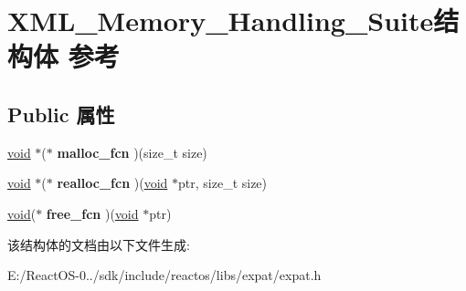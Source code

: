 \hypertarget{struct_x_m_l___memory___handling___suite}{}\section{X\+M\+L\+\_\+\+Memory\+\_\+\+Handling\+\_\+\+Suite结构体 参考}
\label{struct_x_m_l___memory___handling___suite}
\subsection*{Public 属性}
\begin{DoxyCompactItemize}
\item 
\mbox{\label{struct_x_m_l___memory___handling___suite_a3f5c0662300b015874bbe4ee6cf42951}} 
\hyperlink{interfacevoid}{void} $\ast$($\ast$ {\bfseries malloc\+\_\+fcn} )(size\+\_\+t size)
\item 
\mbox{\label{struct_x_m_l___memory___handling___suite_a3af8aa30831e0e75332d3289f7dd2e9f}} 
\hyperlink{interfacevoid}{void} $\ast$($\ast$ {\bfseries realloc\+\_\+fcn} )(\hyperlink{interfacevoid}{void} $\ast$ptr, size\+\_\+t size)
\item 
\mbox{\label{struct_x_m_l___memory___handling___suite_aaf87eb0cabf4e57a92707d9f04d76486}} 
\hyperlink{interfacevoid}{void}($\ast$ {\bfseries free\+\_\+fcn} )(\hyperlink{interfacevoid}{void} $\ast$ptr)
\end{DoxyCompactItemize}


该结构体的文档由以下文件生成\+:\begin{DoxyCompactItemize}
\item 
E\+:/\+React\+O\+S-\/0../sdk/include/reactos/libs/expat/expat.\+h\end{DoxyCompactItemize}
